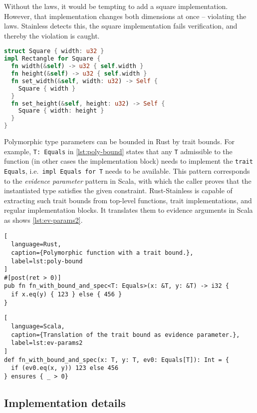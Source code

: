 Without the laws, it would be tempting to add a square implementation.
However, that implementation changes both dimensions at once --
violating the laws. Stainless detects this, the square implementation
fails verification, and thereby the violation is caught.

\begin{lstlisting}[language=Rust, caption={Example implementation violating the laws.}]
struct Square { width: u32 }
impl Rectangle for Square {
  fn width(&self) -> u32 { self.width }
  fn height(&self) -> u32 { self.width }
  fn set_width(&self, width: u32) -> Self {
    Square { width }
  }
  fn set_height(&self, height: u32) -> Self {
    Square { width: height }
  }
}
\end{lstlisting}

Polymorphic type parameters can be bounded in Rust by trait bounds. For example,
\lstinline!T: Equals! in \autoref{lst:poly-bound} states that any \lstinline!T!
admissible to the function (in other cases the implementation block) needs to
implement the \passthrough{\lstinline!trait Equals!},
i.e.~\lstinline!impl Equals for T! needs to be available. This pattern
corresponds to the \emph{evidence parameter} pattern in Scala, with which the
caller proves that the instantiated type satisfies the given constraint.
Rust-Stainless is capable of extracting such trait bounds from top-level
functions, trait implementations, and regular implementation blocks. It
translates them to evidence arguments in Scala as shows \autoref{lst:ev-params2}.

\begin{lstlisting}[
  language=Rust,
  caption={Polymorphic function with a trait bound.},
  label=lst:poly-bound
]
#[post(ret > 0)]
pub fn fn_with_bound_and_spec<T: Equals>(x: &T, y: &T) -> i32 {
  if x.eq(y) { 123 } else { 456 }
}
\end{lstlisting}

\begin{lstlisting}[
  language=Scala,
  caption={Translation of the trait bound as evidence parameter.},
  label=lst:ev-params2
]
def fn_with_bound_and_spec(x: T, y: T, ev0: Equals[T]): Int = {
  if (ev0.eq(x, y)) 123 else 456
} ensures { _ > 0}
\end{lstlisting}

\begin{quote}
\end{quote}



\subsection{Implementation details}

